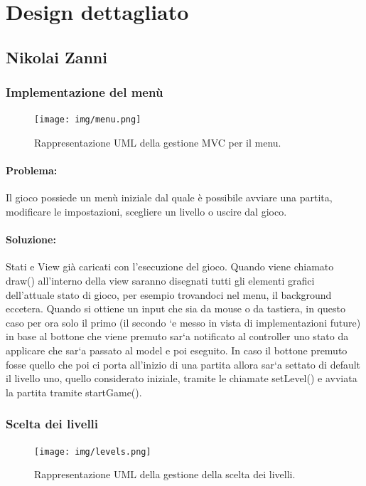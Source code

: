 \section{Design dettagliato}
\subsection{Nikolai Zanni}

\subsubsection{Implementazione del menù}

\begin{figure}[H]
\centering{}
\texttt{[image: img/menu.png]}
\caption{Rappresentazione UML della gestione MVC per il menu.}
\end{figure}

\paragraph{Problema:}
Il gioco possiede un menù iniziale dal quale è possibile avviare una partita, modificare le impostazioni, scegliere un livello o uscire dal gioco.

\paragraph{Soluzione:}
Stati e View già caricati con l'esecuzione del gioco. Quando viene chiamato draw() all’interno della view saranno disegnati tutti gli elementi grafici dell’attuale stato di gioco, per esempio trovandoci nel menu, il background eccetera. Quando si ottiene un input che sia da mouse o da tastiera, in questo caso per ora solo il primo (il secondo `e messo in vista di implementazioni future) in base al bottone che viene premuto sar`a notificato al controller uno stato da applicare che sar`a passato al model e poi eseguito. In caso il bottone premuto fosse quello che poi ci porta all’inizio di una partita allora sar`a settato di default il livello uno, quello considerato iniziale, tramite le chiamate setLevel() e avviata la partita tramite startGame().

\subsubsection{Scelta dei livelli}

\begin{figure}[H]
\centering{}
\texttt{[image: img/levels.png]}
\caption{Rappresentazione UML della gestione della scelta dei livelli.}
\end{figure}

